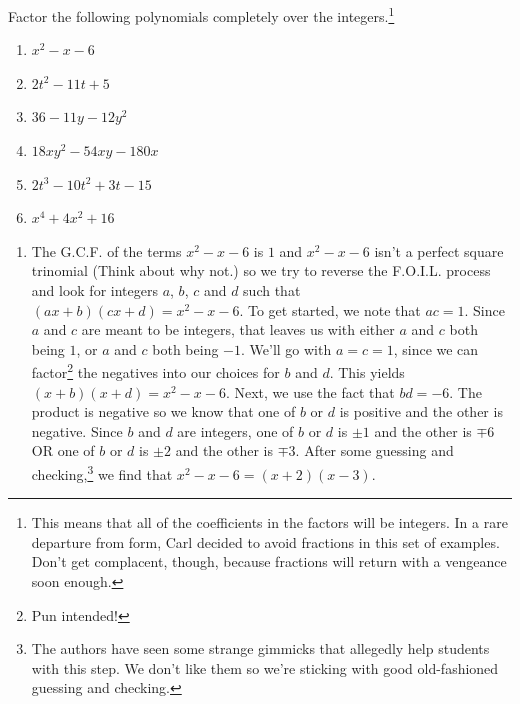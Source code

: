 \documentclass{ximera}
\begin{document}
\begin{example}\label{advfactoring}  Factor the following polynomials completely over the integers.\footnote{This means that all of the coefficients in the factors will be integers. In a rare departure from form, Carl decided to avoid fractions in this set of examples.  Don't get complacent, though, because fractions will return with a vengeance soon enough.}


\begin{enumerate}

\item  $x^2 - x - 6$  

\item  $2t^2 - 11t + 5$

\item  $36 - 11y - 12y^2$

\item  $18xy^2 - 54xy - 180x$

\item  $2t^3 - 10t^2 + 3t - 15$ 

\item  $x^4 + 4x^2 + 16$

\end{enumerate}

\begin{explanation}

\begin{enumerate}

\item  The G.C.F. of the terms $x^2 - x - 6$  is $1$ and $x^2 - x - 6$ isn't a perfect square trinomial (Think about why not.) so we try to reverse the F.O.I.L. process and look for integers $a$, $b$, $c$ and $d$ such that $(ax + b)(cx + d) = x^2 - x - 6$.  To get started, we note that $ac = 1$.  Since $a$ and $c$ are meant to be integers, that leaves us with either $a$ and $c$ both being $1$, or $a$ and $c$ both being $-1$.  We'll go with $a = c = 1$, since we can factor\footnote{Pun intended!} the negatives into our choices for $b$ and $d$.  This yields $(x+b)(x+d) = x^2-x-6$.  Next, we use the fact that $bd = -6$.  The product is negative so we know that one of $b$ or $d$ is positive and the other is negative.  Since $b$ and $d$ are integers, one of $b$ or $d$ is $\pm 1$ and the other is $\mp 6$ OR one of $b$ or $d$ is $\pm 2$ and the other is $\mp 3$. After some guessing and checking,\footnote{The authors have seen some strange gimmicks that allegedly help students with this step.  We don't like them so we're sticking with good old-fashioned guessing and checking.} we find that $x^2 - x - 6 = (x+2)(x-3)$.


\end{enumerate}
\end{explanation}
\end{example}
\end{document}
